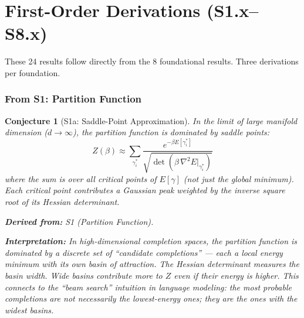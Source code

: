 \documentclass[11pt,letterpaper]{article}
\newtheorem{conjecture}{Conjecture}[section]
\begin{document}
\newpage
\part{First-Order Derivations (S1.x--S8.x)}

These 24 results follow directly from the 8 foundational results. Three 
derivations per foundation.

\section{From S1: Partition Function}

\begin{conjecture}[S1a: Saddle-Point Approximation]\label{conj:saddle}
In the limit of large manifold dimension ($d \to \infty$), the partition 
function is dominated by saddle points:
\begin{equation}
    Z(\beta) \approx \sum_{\gamma^*_i} 
    \frac{e^{-\beta E[\gamma^*_i]}}
    {\sqrt{\det\left(\beta \, \nabla^2 E|_{\gamma^*_i}\right)}}
\end{equation}
where the sum is over all critical points of $E[\gamma]$ (not just 
the global minimum). Each critical point contributes a Gaussian peak 
weighted by the inverse square root of its Hessian determinant.

\textbf{Derived from:} S1 (Partition Function).

\textbf{Interpretation:} In high-dimensional completion spaces, the 
partition function is dominated by a discrete set of ``candidate 
completions'' --- each a local energy minimum with its own basin of 
attraction. The Hessian determinant measures the basin width. Wide 
basins contribute more to $Z$ even if their energy is higher. This 
connects to the ``beam search'' intuition in language modeling: the 
most probable completions are not necessarily the lowest-energy ones; 
they are the ones with the widest basins.
\end{conjecture}
\end{document}
